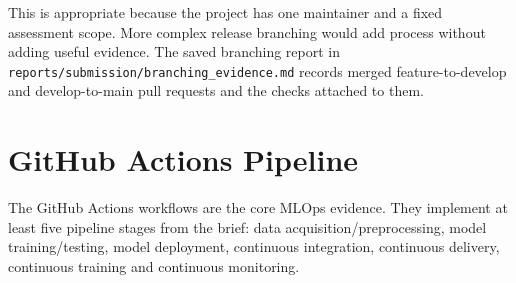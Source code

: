 \documentclass[journal,twoside,web]{ieeecolor}
\begin{document}
This is appropriate because the project has one maintainer and a fixed assessment scope. More complex release branching would add process without adding useful evidence. The saved branching report in \texttt{reports/submission/branching\_evidence.md} records merged feature-to-develop and develop-to-main pull requests and the checks attached to them.

\section{GitHub Actions Pipeline}
The GitHub Actions workflows are the core MLOps evidence. They implement at least five pipeline stages from the brief: data acquisition/preprocessing, model training/testing, model deployment, continuous integration, continuous delivery, continuous training and continuous monitoring.
\end{document}
